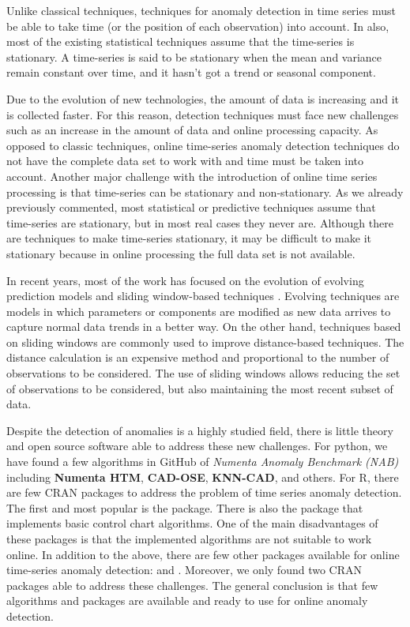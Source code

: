 \documentclass[a4paper]{article}\usepackage[]{graphicx}\usepackage[]{color}
\begin{document}
Unlike classical techniques, techniques for anomaly detection in time series must be able to take time (or the position of each observation) into account. In also, most of the existing statistical techniques assume that the time-series is stationary. A time-series is said to be stationary when the mean and variance remain constant over time, and it hasn't got a trend or seasonal component.

Due to the evolution of new technologies, the amount of data is increasing and it is collected faster. For this reason, detection techniques must face new challenges such as an increase in the amount of data and online processing capacity. As opposed to classic techniques, online time-series anomaly detection techniques do not have the complete data set to work with and time must be taken into account. Another major challenge with the introduction of online time series processing is that time-series can be stationary and non-stationary. As we already previously commented,  most statistical or predictive techniques assume that time-series are stationary, but in most real cases they never are. Although there are techniques to make time-series stationary, it may be difficult to make it stationary because in online processing the full data set is not available.

In recent years, most of the work has focused on the evolution of evolving prediction models and sliding window-based techniques \cite{a3e0f1cf080343d98cae7430cd6e43c4}. Evolving techniques are models in which parameters or components are modified as new data arrives to capture normal data trends in a better way. On the other hand, techniques based on sliding windows are commonly used to improve distance-based techniques. The distance calculation is an expensive method and proportional to the number of observations to be considered. The use of sliding windows allows reducing the set of observations to be considered, but also maintaining the most recent subset of data.

Despite the detection of anomalies is a highly studied field, there is little theory and open source software able to address these new challenges. For python, we have found a few algorithms in GitHub of \emph{Numenta Anomaly Benchmark (NAB)} \cite{7424283} including \textbf{Numenta HTM}, \textbf{CAD-OSE}, \textbf{KNN-CAD}, and others. For R, there are few CRAN packages to address the problem of time series anomaly detection. The first and most popular is the  package. There is also the  package that implements basic control chart algorithms. One of the main disadvantages of these packages is that the implemented algorithms are not suitable to work online. In addition to the above, there are few other packages available for online time-series anomaly detection:  and . Moreover, we only found two CRAN packages able to address these challenges. The general conclusion is that few algorithms and packages are available and ready to use for online anomaly detection.
\end{document}

